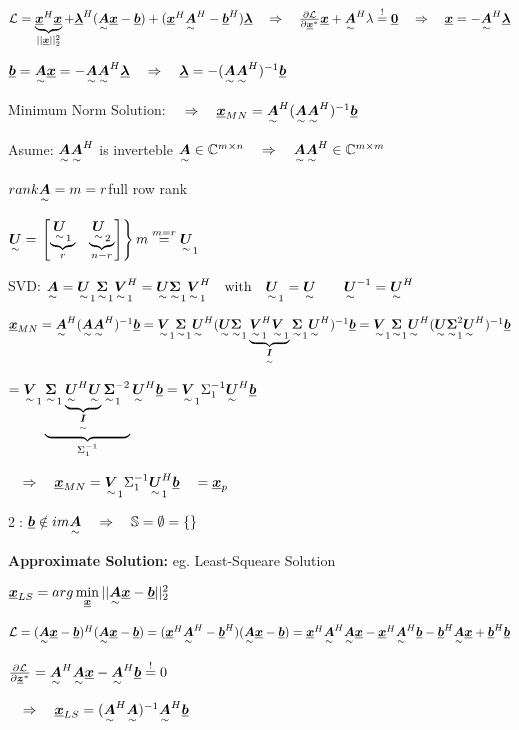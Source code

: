 $\mathcal{L}=\underbrace{\vec{x}^H\vec{x}}_{||\vec{x}||^2_2}+\vec{\lambda}^H(\ma{A}\vec{x}-\vec{b})+(\vec{x}^H\ma{A}^H-\vec{b}^H)\vec{\lambda}
\pfeil\frac{\partial\mathcal{L}}{\partial\vec{x}^*}\vec{x}+\ma{A}^H\lambda\overset{!}{=}\vec{0}
\pfeil\vec{x}=-\ma{A}^H\vec{\lambda}$

$\vec{b}=\ma{A}\vec{x}=-\ma{A}\ma{A}^H\vec{\lambda}\pfeil \vec{\lambda}=-(\ma{A}\ma{A}^H)^{-1}\vec{b}$

Minimum Norm Solution: $\pfeil \vec{x}_{MN}=\ma{A}^H(\ma{A}\ma{A}^H)^{-1}\vec{b}$

Asume: $\ma{A}\ma{A}^H$ is inverteble $\ma{A}\in\mathbb{C}^{m\times n}\pfeil \ma{A}\ma{A}^H\in\mathbb{C}^{m\times m}$

$rank\ma{A}=m=r$\quad full row rank

$\ma{U}=\left.\mat{\underbrace{\ma{U}_1}_{r}&\underbrace{\ma{U}_2}_{n-r}}\right\rbrace m \overset{m=r}{=}\ma{U}_1$

SVD: $\ma{A}=\ma{U}_1\ma{\Sigma}_1\ma{V}_1^H=\ma{U}\ma{\Sigma}_1\ma{V}_1^H \with \ma{U}_1=\ma{U} \qquad \ma{U}^{-1} = \ma{U}^H$

$\vec{x}_{MN}=\ma{A}^H(\ma{A}\ma{A}^H)^{-1}\vec{b}
=\ma{V}_1\ma{\Sigma}_1\ma{U}^H(\ma{U}\ma{\Sigma}_1\underbrace {\ma{V}_1^H\ma{V}_1}_{\ma{I}}\ma{\Sigma}_1\ma{U}^H)^{-1}\vec{b}
=\ma{V}_1\ma{\Sigma}_1\ma{U}^H(\ma{U}\ma{\Sigma}_1^2\ma{U}^H)^{-1}\vec{b}$

$=\ma{V}_1\underbrace{\ma{\Sigma}_1\underbrace{\ma{U}^H\ma{U}}_{\ma{I}}\ma{\Sigma}_1^{-2}}_{\Sigma_1^{-1}}\ma{U}^H\vec{b}
=\ma{V}_1\Sigma_1^{-1}\ma{U}^H\vec{b}$

$\pfeil\vec{x}_{MN}=\ma{V}_1\Sigma_1^{-1}\ma{U}_1^H\vec{b}   \quad = \vec{x}_p$ 


\textcircled{2}:  $\vec{b}\notin im\ma{A}\pfeil \mathbb{S}=\emptyset=\left\lbrace\right\rbrace$

\textbf{Approximate Solution:} eg. Least-Squeare Solution

$\vec{x}_{LS}=arg\min\limits_{\vec{x}}||\ma{A}\vec{x}-\vec{b}||^2_2$

$\mathcal{L}=(\ma{A}\vec{x}-\vec{b})^H(\ma{A}\vec{x}-\vec{b})=(\vec{x}^H\ma{A}^H-\vec{b}^H)(\ma{A}\vec{x}-\vec{b})=\vec{x}^H\ma{A}^H\ma{A}\vec{x}-\vec{x}^H\ma{A}^H\vec{b}-\vec{b}^H\ma{A}\vec{x}+\vec{b}^H\vec{b}$

$\frac{\partial \mathcal{L}}{\partial \vec{z}^*}=\ma{A}^H\ma{A}\vec{x}-\ma{A}^H\vec{b}\overset{!}{=}0$

$ \pfeil \vec{x}_{LS}=(\ma{A}^H\ma{A})^{-1}\ma{A}^H\vec{b}$


